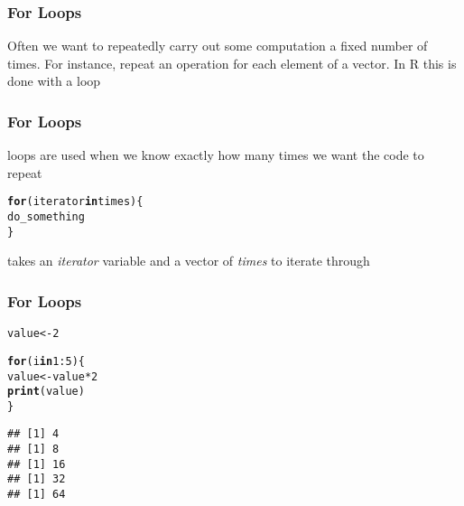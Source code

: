 \documentclass[12pt]{beamer}\usepackage[]{graphicx}\usepackage[]{color}
\makeatletter
\newcommand{\hlnum}[1]{\textcolor[rgb]{0.686,0.059,0.569}{#1}}%
\newcommand{\hlopt}[1]{\textcolor[rgb]{0,0,0}{#1}}%
\newcommand{\hlstd}[1]{\textcolor[rgb]{0.345,0.345,0.345}{#1}}%
\newcommand{\hlkwa}[1]{\textcolor[rgb]{0.161,0.373,0.58}{\textbf{#1}}}%
\newcommand{\hlkwb}[1]{\textcolor[rgb]{0.69,0.353,0.396}{#1}}%
\newcommand{\hlkwd}[1]{\textcolor[rgb]{0.737,0.353,0.396}{\textbf{#1}}}%
\newenvironment{kframe}{%
 \def\at@end@of@kframe{}%
 \ifinner\ifhmode%
  \def\at@end@of@kframe{\end{minipage}}%
  \begin{minipage}{\columnwidth}%
 \fi\fi%
 \def\FrameCommand##1{\hskip\@totalleftmargin \hskip-\fboxsep
 \colorbox{shadecolor}{##1}\hskip-\fboxsep
     \hskip-\linewidth \hskip-\@totalleftmargin \hskip\columnwidth}%
 \MakeFramed {\advance\hsize-\width
   \@totalleftmargin\z@ \linewidth\hsize
   \@setminipage}}%
 {\par\unskip\endMakeFramed%
 \at@end@of@kframe}
\newenvironment{knitrout}{}{} %
\makeatother
\begin{document}
\begin{frame}
\frametitle{For Loops}

Often we want to repeatedly carry out some computation a fixed number of times. For instance, repeat an operation for each element of a vector. In R this is done with a {\hilit {}} loop 

\end{frame}


\begin{frame}[fragile]
\frametitle{For Loops}

 loops are used when we know exactly how many times we want the code to repeat
\begin{knitrout}\footnotesize
{}\color{fgcolor}\begin{kframe}
\begin{alltt}
\hlkwa{for} \hlstd{(iterator} \hlkwa{in} \hlstd{times) \{}
  \hlstd{do_something}
\hlstd{\}}
\end{alltt}
\end{kframe}
\end{knitrout}

 takes an \textit{iterator} variable and a vector of \textit{times} to iterate through

\end{frame}


\begin{frame}[fragile]
\frametitle{For Loops}

\begin{knitrout}\footnotesize
{}\color{fgcolor}\begin{kframe}
\begin{alltt}
\hlstd{value} \hlkwb{<-} \hlnum{2}

\hlkwa{for} \hlstd{(i} \hlkwa{in} \hlnum{1}\hlopt{:}\hlnum{5}\hlstd{) \{}
  \hlstd{value} \hlkwb{<-} \hlstd{value} \hlopt{*} \hlnum{2}
  \hlkwd{print}\hlstd{(value)}
\hlstd{\}}
\end{alltt}
\begin{verbatim}
## [1] 4
## [1] 8
## [1] 16
## [1] 32
## [1] 64
\end{verbatim}
\end{kframe}
\end{knitrout}

\end{frame}
\end{document}

